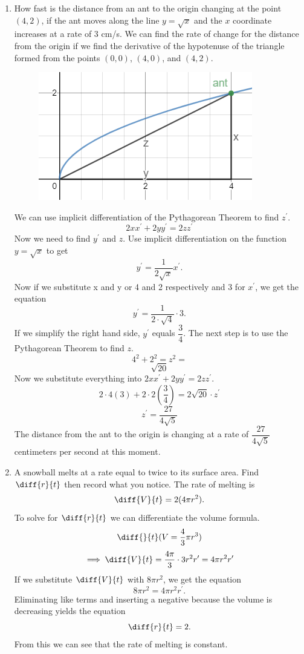 \documentclass{article}
\begin{document}
\begin{enumerate}[label=\textbf{(10.\arabic*)}]


\item How fast is the distance from an ant to the origin changing at the point $(4,2)$, if the ant moves along the line $y=\sqrt{x}$ and the $x$ coordinate increases at a rate of $3$ cm/s.
\newline
\newline
We can find the rate of change for the distance from the origin if we find the derivative of the hypotenuse of the triangle formed from the points $(0,0)$, $(4,0)$, and $(4,2)$.
\begin{figure}[h]
\centering
\includegraphics[scale=.5]{graph2}
\end{figure}
\newline
 We can use implicit differentiation of the Pythagorean Theorem to find $z^{\prime}$.
\[2xx^\prime+2yy^\prime=2zz^\prime\]
Now we need to find $y^\prime$ and $z$.
Use implicit differentiation on the function $y=\sqrt{x}$ to get
\[y^{\prime}=\frac{1}{2\sqrt{x}}x^{\prime}\text{.}\]
Now if we substitute x and y or 4 and 2 respectively and 3 for $x^{\prime}$, we get the equation
\[y^{\prime}=\frac{1}{2\cdot\sqrt{4}}\cdot 3 \text{.}\]
If we simplify the right hand side, $y^{\prime}$ equals $\dfrac{3}{4}$. The next step is to use the Pythagorean Theorem to find $z$.
\[4^2+2^2=z^2=\]
\[\sqrt{20}\]
Now we substitute everything into $2xx^\prime+2yy^\prime=2zz^\prime$.
\[2\cdot4(3)+2\cdot2(\frac{3}{4})=2\sqrt{20}\cdot z^\prime\]
\[z^\prime=\frac{27}{4\sqrt{5}}\]
The distance from the ant to the origin is changing at a rate of $\dfrac{27}{4\sqrt{5}}$ centimeters per second at this moment.
\newline


\item A snowball melts at a rate equal to twice to its surface area. Find $\diff{r}{t}$ then record what you notice. 
The rate of melting is
\[\diff{V}{t}=2(4\pi r^2)\text{.}\]
To solve for $\diff{r}{t}$ we can differentiate the volume formula.
\[\diff{ }{t}(V=\frac{4}{3}\pi r^3)\]
\[\implies\diff{V}{t}=\frac{4\pi}{3}\cdot3r^2r^\prime=4\pi r^2r^\prime\]
If we substitute $\diff{V}{t}$ with $8\pi r^2$, we get the equation
\[8\pi r^2=4\pi r^2r^\prime\text{.}\]
Eliminating like terms and inserting a negative because the volume is decreasing yields the equation
\[\diff{r}{t}=2\text{.}\]
From this we can see that the rate of melting is constant.
\newline


\end{enumerate}
\end{document}
